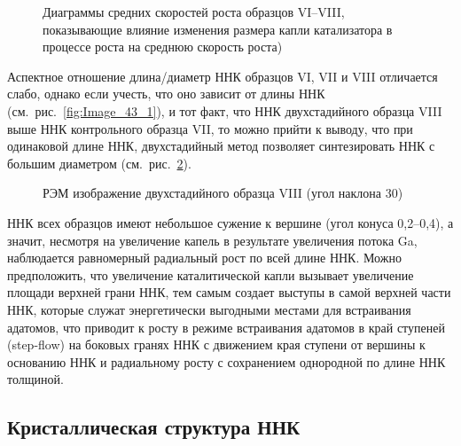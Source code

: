 \begin{figure}[ht]  
\caption{Диаграммы средних скоростей роста образцов VI--VIII, показывающие
влияние изменения размера капли катализатора в процессе роста на среднюю
скорость роста)}\label{fig:Image_44_2} \end{figure}

Аспектное отношение длина/диаметр ННК образцов VI, VII и VIII отличается слабо,
однако если учесть, что оно зависит от длины ННК
(см.~рис.~\cref{fig:Image_43_1}), и тот факт, что ННК двухстадийного образца
VIII выше ННК контрольного образца VII, то можно прийти к выводу, что при
одинаковой длине ННК, двухстадийный метод позволяет синтезировать ННК с большим
диаметром (см.~рис.~\cref{fig:Image_45}).

\begin{figure}[ht]  \caption{РЭМ изображение
двухстадийного образца VIII (угол наклона 30{\textdegree})}\label{fig:Image_45}
\end{figure}

ННК всех образцов имеют небольшое сужение к вершине (угол конуса
0,2--0,4{\textdegree}), а значит, несмотря на увеличение капель в результате
увеличения потока Ga, наблюдается равномерный радиальный рост по всей длине
ННК. Можно предположить, что увеличение каталитической капли вызывает
увеличение площади верхней грани ННК, тем самым создает выступы в самой верхней
части ННК, которые служат энергетически выгодными местами для встраивания
адатомов, что приводит к росту в режиме встраивания адатомов в край ступеней
(step-flow) на боковых гранях ННК с движением края ступени от вершины к
основанию ННК и радиальному росту с сохранением однородной по длине ННК
толщиной.

\subsection{Кристаллическая структура ННК}\label{subsec:ch6/sec2/sub6}

